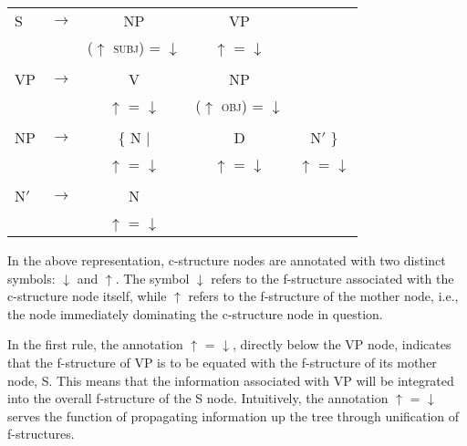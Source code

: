 \begin{tabular}{lcccc}
	S & $\longrightarrow$ & NP & VP &\\
	&			   & ($\uparrow$ \textsc{subj}) = $\downarrow$ & $\uparrow$ = $\downarrow$ &\\
	& & & &\\
	VP & $\longrightarrow$ & V & NP &\\
	&			   & $\uparrow$ = $\downarrow$ & ($\uparrow$ \textsc{obj}) = $\downarrow$ &\\
	& & & &\\
	NP & $\longrightarrow$ & \{\hspace{4pt} N \hspace{15pt} |& \hspace{-20pt} D & \hspace{4pt} N$'$ \hspace{4pt} \}\\
	& & \hspace{4pt} $\uparrow$ = $\downarrow$ \hspace{15pt} & \hspace{-20pt} $\uparrow$ = $\downarrow$ & $\uparrow$ = $\downarrow$ \hspace{4pt} \\
	& & & &\\
	N$'$ & $\longrightarrow$ & N & &\\
	&	 & $\uparrow$ = $\downarrow$ & & \\
\end{tabular}
\xe

In the above representation, c-structure nodes are annotated with two distinct symbols: $\downarrow$ and $\uparrow$. The symbol $\downarrow$ refers to the f-structure associated with the c-structure node itself, while $\uparrow$ refers to the f-structure of the mother node, i.e., the node immediately dominating the c-structure node in question.

In the first rule, the annotation $\uparrow$ = $\downarrow$, directly below the VP node, indicates that the f-structure of VP is to be equated with the f-structure of its mother node, S. This means that the information associated with VP will be integrated into the overall f-structure of the S node. Intuitively, the annotation $\uparrow$ = $\downarrow$ serves the function of propagating information up the tree through unification of f-structures.

